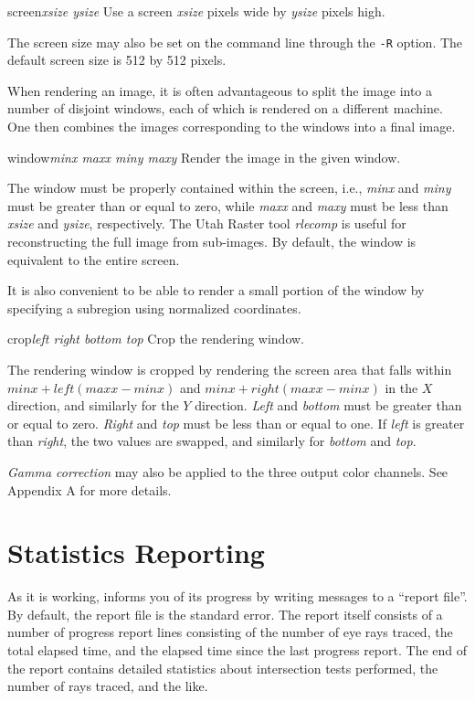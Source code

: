 \begin{defkey}{screen}{{\em xsize ysize}}
	Use a screen {\em xsize} pixels wide by {\em ysize} pixels high.
\end{defkey}
The screen size may also be set on the command line through
the {\tt -R} option.
The default
screen size is 512 by 512 pixels.

When rendering an image, it is often advantageous to split the image
into a number of disjoint windows, each of which is rendered
on a different machine.  One then combines the images corresponding to
the windows into a final image.

\begin{defkey}{window}{{\em minx maxx miny maxy}}
	Render the image in the given window.
\end{defkey}
The window must be properly
contained within the screen, i.e., {\em minx} and {\em miny} must
be greater than or equal to zero, while {\em maxx} and
{\em maxy} must be less than {\em xsize} and {\em ysize}, respectively.
The Utah Raster tool
{\em rlecomp\/} is useful for reconstructing the full image from
sub-images.
By default, the window
is equivalent to the entire screen.

It is also convenient to be able to render a small portion
of the window by specifying a subregion using normalized coordinates.

\begin{defkey}{crop}{{\em left right bottom top}}
	Crop the rendering window.
\end{defkey}
The rendering window is cropped by rendering the screen
area that falls within $minx + left(maxx - minx)$ and
$minx + right(maxx - minx)$ in the $X$ direction, and similarly
for the $Y$ direction.
{\em Left} and {\em bottom} must be greater than or equal to zero.
{\em Right} and {\em top} must be less than or equal to one.
If {\em left} is greater than {\em right}, the two values are
swapped, and similarly for {\em bottom} and {\em top}.

{\em Gamma correction} may also be applied to the three output color
channels.  See Appendix A for more details.

\section{Statistics Reporting}

As it is working, {\rayshade} informs you of its progress by writing
messages to a ``report file''.  By default, the report file is the
standard error.  The report itself consists of a number of
progress report lines consisting of the number of eye rays traced,
the total elapsed time, and the elapsed time since the last progress report.
The end of the report contains detailed statistics about intersection
tests performed, the number of rays traced, and the like.

